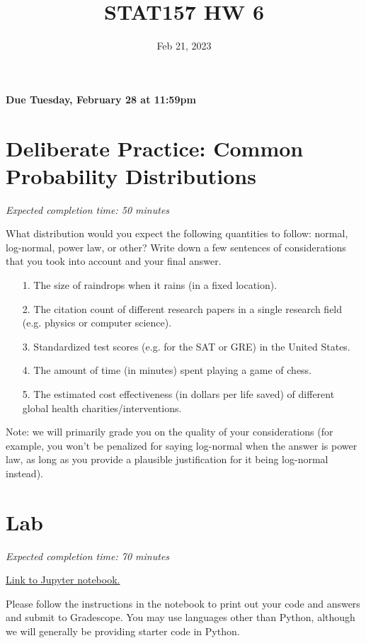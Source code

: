 \documentclass[11pt]{article}
\title{STAT157 HW 6}
\date{Feb 21, 2023}
\begin{document}
\maketitle

\hfill \textbf{Due Tuesday, February 28 at 11:59pm}

\section*{Deliberate Practice: Common Probability Distributions}

\emph{Expected completion time: 50 minutes}

What distribution would you expect the following quantities to follow: normal, log-normal, power law, or other? Write down a few sentences of considerations that you took into account and your final answer. 

\begin{enumerate}
	\item[1.] The size of raindrops when it rains (in a fixed location).
	\item[2.] The citation count of different research papers in a single research field (e.g. physics or computer science).
	\item[3.] Standardized test scores (e.g. for the SAT or GRE) in the United States.
	\item[4.] The amount of time (in minutes) spent playing a game of chess.
	\item[5.] The estimated cost effectiveness (in dollars per life saved) of different global health charities/interventions.
\end{enumerate}

Note: we will primarily grade you on the quality of your considerations (for example, you won't be penalized for saying log-normal when the answer is power law, as long as you provide a plausible justification for it being log-normal instead).

\section*{Lab}

\emph{Expected completion time: 70 minutes}

\href{http://datahub.berkeley.edu/hub/user-redirect/git-pull?repo=https%3A%2F%2Fgithub.com%2Fjs-d%2Fforecasting-class-sp23&urlpath=tree%2Fforecasting-class-sp23%2Fhw%2Fhw6%2Fhw6lab.ipynb&branch=main}{Link to Jupyter notebook.}

Please follow the instructions in the notebook to print out your code and answers and submit to Gradescope. You may use languages other than Python, although we will generally be providing starter code in Python.
\end{document}
